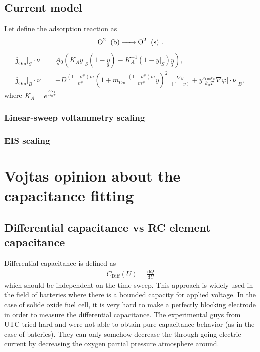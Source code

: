 \documentclass[a4 paper]{article}
\newcommand\kB{k_\mathrm{B}}
\newcommand\Om{\mathrm{Om}}
\newcommand\mL{m^\#}
\newcommand\vL{v^\#}
\newcommand\nuL{\nu^\#}
\newcommand{\dd}{\mathrm{d}}
\newcommand{\us}[1]{\underset{\textrm{s}}{#1}{}}
\begin{document}
\subsection{Current model}
Let define the adsorption reaction as 
\begin{align}
    \ce{O^2-(b) -> O^2-(s)}~.
    \label{}
\end{align}
\begin{align}
    \mathbf{j}_\Om|_S\cdot\nu &= \us A_0 \left(K_A y|_S (1-\us y) -K_A^{-1} (1-y|_S)\us y  \right), \\
    \mathbf{j}_\Om|_B\cdot\nu &= - D \frac{(1 - \nuL)m}{\vL}
                        \left( 1 +m_\Om\frac{(1 - \nuL)m}{\mL} y \right)^2 
                    \Bigg[
                      \frac{\nabla y}{(1- y)}
                      +y \frac{z_{\Om} e_0}{\kB T} \nabla \varphi
                    \Bigg]\cdot\nu\Bigg|_B,
    \label{}
\end{align}
where $K_A = e^\frac{\Delta G_A}{2\kB T}$ 
\subsubsection{Linear-sweep voltammetry scaling}
\subsubsection{EIS scaling}

\section{Vojtas opinion about the capacitance fitting}

\subsection{Differential capacitance vs RC element capacitance}
Differential capacitance is defined as 
\begin{align}
C_\text{Diff}(U) = \frac{\dd Q}{\dd U}
\end{align}
which should be independent on the time sweep. This approach is widely used in the field of batteries where there is a bounded capacity for applied voltage. In the case of solide oxide fuel cell, it is very hard to make a perfectly blocking electrode in order to measure the differential capacitance. The experimental guys from UTC tried hard and were not able to obtain pure capacitance behavior (as in the case of bateries). They can only somehow decrease the through-going electric current by decreasing the oxygen partial pressure atmosphere around. 
\end{document}
